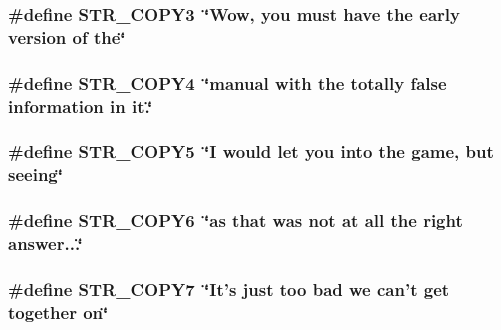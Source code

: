 \label{F__SPEAR_8H_ae864cbb961c9e408817d3d86336b4671}
\hypertarget{F__SPEAR_8H_adba1081b6e149c0c3f799b8a359d9e04}{
\subsubsection[{STR\_\-COPY3}]{\setlength{\rightskip}{0pt plus 5cm}\#define STR\_\-COPY3~\char`\"{}Wow, you must have the early version of the\char`\"{}}}
\label{F__SPEAR_8H_adba1081b6e149c0c3f799b8a359d9e04}
\hypertarget{F__SPEAR_8H_a2790b0934af47a38803c5e05d2ebc49d}{
\subsubsection[{STR\_\-COPY4}]{\setlength{\rightskip}{0pt plus 5cm}\#define STR\_\-COPY4~\char`\"{}manual with the totally false information in it.\char`\"{}}}
\label{F__SPEAR_8H_a2790b0934af47a38803c5e05d2ebc49d}
\hypertarget{F__SPEAR_8H_adffe4523d436e765eb75160d1fdf3a63}{
\subsubsection[{STR\_\-COPY5}]{\setlength{\rightskip}{0pt plus 5cm}\#define STR\_\-COPY5~\char`\"{}I would let you into the game, but seeing\char`\"{}}}
\label{F__SPEAR_8H_adffe4523d436e765eb75160d1fdf3a63}
\hypertarget{F__SPEAR_8H_a5e55c53fa4d56d59b6244a063bfd691f}{
\subsubsection[{STR\_\-COPY6}]{\setlength{\rightskip}{0pt plus 5cm}\#define STR\_\-COPY6~\char`\"{}as that was not at all the right answer...\char`\"{}}}
\label{F__SPEAR_8H_a5e55c53fa4d56d59b6244a063bfd691f}
\hypertarget{F__SPEAR_8H_a854b8416c000b973e2e0c5e2028c653f}{
\subsubsection[{STR\_\-COPY7}]{\setlength{\rightskip}{0pt plus 5cm}\#define STR\_\-COPY7~\char`\"{}It's just too bad we can't get together on\char`\"{}}}
